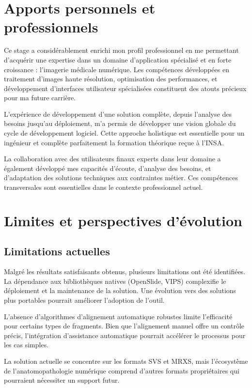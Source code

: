 \documentclass[12pt,a4paper]{report}
\begin{document}
\begin{}
\begin{}
\begin{}
\begin{}
\section{Apports personnels et professionnels}

Ce stage a considérablement enrichi mon profil professionnel en me permettant d'acquérir une expertise dans un domaine d'application spécialisé et en forte croissance : l'imagerie médicale numérique. Les compétences développées en traitement d'images haute résolution, optimisation des performances, et développement d'interfaces utilisateur spécialisées constituent des atouts précieux pour ma future carrière.

L'expérience de développement d'une solution complète, depuis l'analyse des besoins jusqu'au déploiement, m'a permis de développer une vision globale du cycle de développement logiciel. Cette approche holistique est essentielle pour un ingénieur et complète parfaitement la formation théorique reçue à l'INSA.

La collaboration avec des utilisateurs finaux experts dans leur domaine a également développé mes capacités d'écoute, d'analyse des besoins, et d'adaptation des solutions techniques aux contraintes métier. Ces compétences transversales sont essentielles dans le contexte professionnel actuel.

\section{Limites et perspectives d'évolution}

\subsection{Limitations actuelles}

Malgré les résultats satisfaisants obtenus, plusieurs limitations ont été identifiées. La dépendance aux bibliothèques natives (OpenSlide, VIPS) complexifie le déploiement et la maintenance de la solution. Une évolution vers des solutions plus portables pourrait améliorer l'adoption de l'outil.

L'absence d'algorithmes d'alignement automatique robustes limite l'efficacité pour certains types de fragments. Bien que l'alignement manuel offre un contrôle précis, l'intégration d'assistance automatique pourrait accélérer le processus pour les cas simples.

La solution actuelle se concentre sur les formats SVS et MRXS, mais l'écosystème de l'anatomopathologie numérique comprend d'autres formats propriétaires qui pourraient nécessiter un support futur.


\end{}
\end{}
\end{}
\end{}
\end{document}
